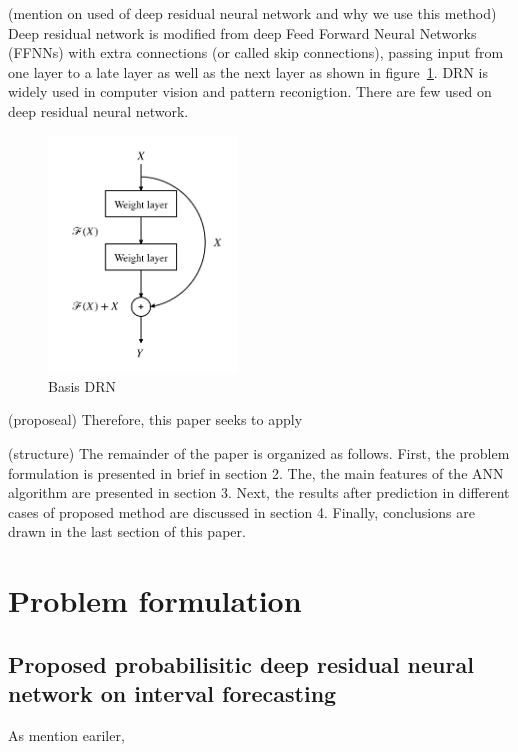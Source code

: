 \documentclass[review]{elsarticle}
\begin{document}
  (mention on used of deep residual neural network and why we use this method)
  Deep residual network is modified from deep Feed Forward Neural Networks (FFNNs) with extra connections (or called skip connections), passing input from one layer to a late layer as well as the next layer as shown in figure~\ref{Fig:Basic_DRN}. DRN is widely used in computer vision and pattern reconigtion. There are few used on deep residual neural network.

  \begin{figure}[H]
    \caption{Basis DRN}
    \label{Fig:Basic_DRN}
    \includegraphics[width=5cm]{basic_DRN}
  \centering
  \end{figure}


  (proposeal) Therefore, this paper seeks to apply

  (structure) The remainder of the paper is organized as follows. First, the problem formulation is presented in brief in section 2. The, the main features of the ANN algorithm are presented in section 3. Next, the results after prediction in different cases of proposed method  are discussed in section 4. Finally, conclusions are drawn in the last section of this paper.

\section{Problem formulation}

  \subsection{Proposed probabilisitic deep residual neural network on interval forecasting}

  As mention eariler,
\end{document}
